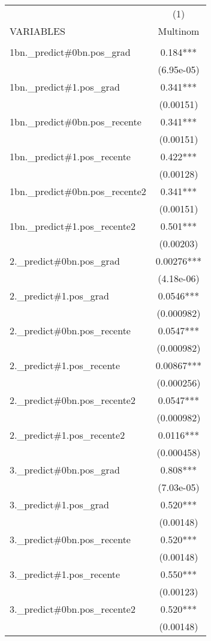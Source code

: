 \documentclass[]{article}
\begin{document}
\begin{tabular}{lc} \hline
 & (1) \\
VARIABLES & Multinom \\ \hline
 &  \\
1bn.\_predict\#0bn.pos\_grad & 0.184*** \\
 & (6.95e-05) \\
1bn.\_predict\#1.pos\_grad & 0.341*** \\
 & (0.00151) \\
1bn.\_predict\#0bn.pos\_recente & 0.341*** \\
 & (0.00151) \\
1bn.\_predict\#1.pos\_recente & 0.422*** \\
 & (0.00128) \\
1bn.\_predict\#0bn.pos\_recente2 & 0.341*** \\
 & (0.00151) \\
1bn.\_predict\#1.pos\_recente2 & 0.501*** \\
 & (0.00203) \\
2.\_predict\#0bn.pos\_grad & 0.00276*** \\
 & (4.18e-06) \\
2.\_predict\#1.pos\_grad & 0.0546*** \\
 & (0.000982) \\
2.\_predict\#0bn.pos\_recente & 0.0547*** \\
 & (0.000982) \\
2.\_predict\#1.pos\_recente & 0.00867*** \\
 & (0.000256) \\
2.\_predict\#0bn.pos\_recente2 & 0.0547*** \\
 & (0.000982) \\
2.\_predict\#1.pos\_recente2 & 0.0116*** \\
 & (0.000458) \\
3.\_predict\#0bn.pos\_grad & 0.808*** \\
 & (7.03e-05) \\
3.\_predict\#1.pos\_grad & 0.520*** \\
 & (0.00148) \\
3.\_predict\#0bn.pos\_recente & 0.520*** \\
 & (0.00148) \\
3.\_predict\#1.pos\_recente & 0.550*** \\
 & (0.00123) \\
3.\_predict\#0bn.pos\_recente2 & 0.520*** \\
 & (0.00148) \\

\end{tabular}
\end{document}
